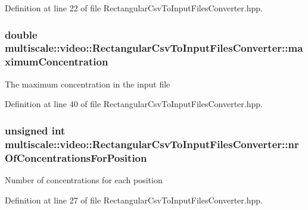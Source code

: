 Definition at line 22 of file Rectangular\-Csv\-To\-Input\-Files\-Converter.\-hpp.

\hypertarget{classmultiscale_1_1video_1_1RectangularCsvToInputFilesConverter_aeddcdf92c6f79bf41546fd417d0808b1}{
\subsubsection[{maximum\-Concentration}]{\setlength{\rightskip}{0pt plus 5cm}double multiscale\-::video\-::\-Rectangular\-Csv\-To\-Input\-Files\-Converter\-::maximum\-Concentration\hspace{0.3cm}{\ttfamily [private]}}}\label{classmultiscale_1_1video_1_1RectangularCsvToInputFilesConverter_aeddcdf92c6f79bf41546fd417d0808b1}
The maximum concentration in the input file 

Definition at line 40 of file Rectangular\-Csv\-To\-Input\-Files\-Converter.\-hpp.

\hypertarget{classmultiscale_1_1video_1_1RectangularCsvToInputFilesConverter_a0bfea1eb0f7dc76deee05af1e2eb744b}{
\subsubsection[{nr\-Of\-Concentrations\-For\-Position}]{\setlength{\rightskip}{0pt plus 5cm}unsigned int multiscale\-::video\-::\-Rectangular\-Csv\-To\-Input\-Files\-Converter\-::nr\-Of\-Concentrations\-For\-Position\hspace{0.3cm}{\ttfamily [private]}}}\label{classmultiscale_1_1video_1_1RectangularCsvToInputFilesConverter_a0bfea1eb0f7dc76deee05af1e2eb744b}
Number of concentrations for each position 

Definition at line 27 of file Rectangular\-Csv\-To\-Input\-Files\-Converter.\-hpp.

